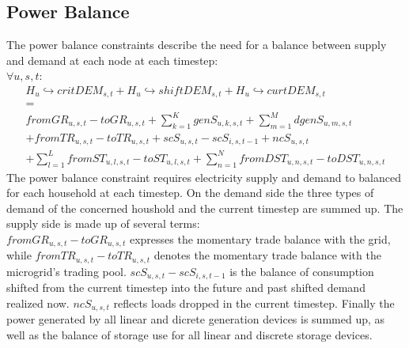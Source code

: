 \documentclass[
	11pt,								%
	DIV10,								%
	a4paper,         					%
	oneside,							%
	headheight=20pt,					%
	footheight=20pt,					%
    parskip=full,						%
    listof=totoc,						%
	bibliography=totoc,					%
	index=totoc,						%
]{scrartcl}
\begin{document}
\subsection{Power Balance}
The power balance constraints describe the need for a balance between supply and demand at each node at each timestep: 
\\
$\forall u,s,t$:
\begin{equation}
	\begin{split}
		H_u\hookrightarrow  critDEM_{s,t} + H_u\hookrightarrow  shiftDEM_{s,t} + H_u\hookrightarrow  curtDEM_{s,t}\\
		= \\
		fromGR_{u,s,t} - toGR_{u,s,t} + \sum_{k=1}^K{genS_{u,k,s,t}} + \sum_{m=1}^M{dgenS_{u,m,s,t}} \\ 
		+ fromTR_{u,s,t} - toTR_{u,s,t} + scS_{u,s,t} - scS_{i,s,t-1} + ncS_{u,s,t} \\
		+ \sum_{l=1}^L{fromST_{u,l,s,t} - toST_{u,l,s,t}} + \sum_{n=1}^N{fromDST_{u,n,s,t}-toDST_{u,n,s,t}}
	\end{split}
\end{equation}
The power balance constraint requires electricity supply and demand to balanced for each household at each timestep. On the demand side the three types of demand of the concerned houshold and the current timestep are summed up. The supply side is made up of several terms: \\
$fromGR_{u,s,t} - toGR_{u,s,t}$ expresses the momentary trade balance with the grid, while $fromTR_{u,s,t} - toTR_{u,s,t}$ denotes the momentary trade balance with the microgrid's trading pool. $scS_{u,s,t} - scS_{i,s,t-1}$ is the balance of consumption shifted from the current timestep into the future and past shifted demand realized now. $ncS_{u,s,t}$ reflects loads dropped in the current timestep. Finally the power generated by all linear and dicrete generation devices is summed up, as well as the balance of storage use for all linear and discrete storage devices.
\end{document}
